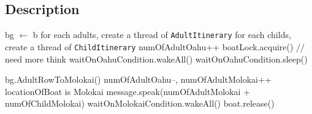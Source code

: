 \documentclass{article}
\begin{document}
\subsection{Description}

\begin{algorithm}
    \begin{algorithmic}
        \State bg $\leftarrow$ b
        \State for each adults, create a thread of \texttt{AdultItinerary}
        \State for each childs, create a thread of \texttt{ChildItinerary}
        \EndWhile
    \EndProcedure
        \State numOfAdultOahu++
        \State boatLock.acquire()
         $//$ need more think
                \State waitOnOahuCondition.wakeAll()
            \EndIf
            \State waitOnOahuCondition.sleep()
        \EndWhile
        
        \State bg.AdultRowToMolokai()
        \State numOfAdultOahu--, numOfAdultMolokai++
        \State locationOfBoat is Molokai
        \State message.speak(numOfAdultMolokai + numOfChildMolokai)
        \State waitOnMolokaiCondition.wakeAll()
        \State boat.release()        
    \EndProcedure
    \end{algorithmic}
\end{algorithm}
\end{document}
